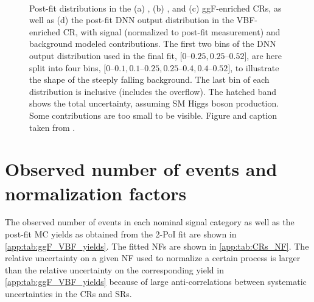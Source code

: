     \begin{figure}[htp]
        \centering
         \\
        \caption[Post-fit \mT distributions in the ggF \Ztt control regions.]{
            Post-fit \mT distributions in the (a) \ZeroJet, (b) \OneJet, and (c) ggF-enriched \TwoJet \Ztt CRs, as well as (d) the post-fit DNN output distribution in the VBF-enriched \TwoJet \Ztt CR, with signal (normalized to post-fit measurement) and background modeled contributions.
            The first two bins of the DNN output distribution used in the final fit, $[0$--$0.25,0.25$--$0.52]$, are here split into four bins, $[0$--$0.1,0.1$--$0.25,0.25$--$0.4,0.4$--$0.52]$, to illustrate the shape of the steeply falling background.
            The last bin of each \mT distribution is inclusive (includes the overflow).
            The hatched band shows the total uncertainty, assuming SM Higgs boson production.
            Some contributions are too small to be visible.
            Figure and caption taken from .
            \label{app:fig:Ztt_CRs}
        }
    \end{figure}

    \clearpage
    \FloatBarrier
    \section{Observed number of events and normalization factors}

    The observed number of events in each nominal signal category as well as the post-fit MC yields as obtained from the 2-PoI fit are shown in \cref{app:tab:ggF_VBF_yields}.
    The fitted NFs are shown in \cref{app:tab:CRs_NF}.
    The relative uncertainty on a given NF used to normalize a certain process is larger than the relative uncertainty on the corresponding yield in \cref{app:tab:ggF_VBF_yields} because of large anti-correlations between systematic uncertainties in the CRs and SRs.

